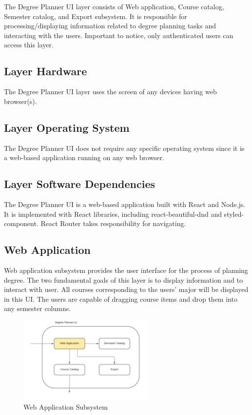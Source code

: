 The Degree Planner UI layer consists of Web application, Course catalog, Semester catalog, and Export subsystem. It is responsible for processing/displaying information related to degree planning tasks and interacting with the users. Important to notice, only authenticated users can access this layer.

\subsection{Layer Hardware}
The Degree Planner UI layer uses the screen of any devices having web browser(s).

\subsection{Layer Operating System}
The Degree Planner UI does not require any specific operating system since it is a web-based application running on any web browser.

\subsection{Layer Software Dependencies}
The Degree Planner UI is a web-based application built with React and Node.js. It is implemented with React libraries, including react-beautiful-dnd and styled-component. React Router takes responsibility for navigating.

\subsection{Web Application}
Web application subsystem provides the user interface for the process of planning degree. The two fundamental goals of this layer is to display information and to interact with user. All courses corresponding to the users' major will be displayed in this UI. The users are capable of dragging course items and drop them into any semester columns.

\begin{figure}[h!]
	\centering
 	\includegraphics[width=0.60\textwidth]{images/WebApplication} %
 \caption{Web Application Subsystem} %
\end{figure}

